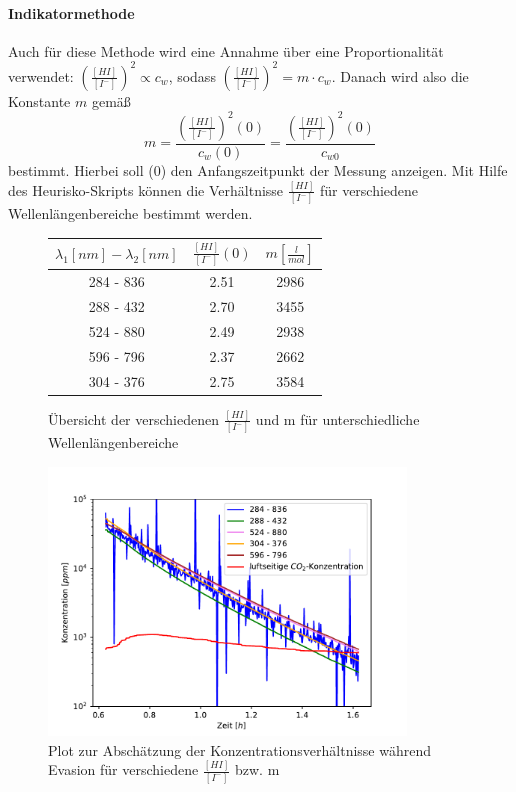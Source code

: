 \documentclass[12pt]{article}
\begin{document}
\paragraph{Indikatormethode\\}

Auch für diese Methode wird eine Annahme über eine Proportionalität verwendet: $(\frac{[HI]}{[I^-]})^2 \propto c_w $, sodass $(\frac{[HI]}{[I^-]})^2 = m \cdot c_w $. Danach wird also die Konstante $m$ gemäß
\begin{equation}
m = \frac{(\frac{[HI]}{[I^-]})^2(0)}{c_w(0)} = \frac{(\frac{[HI]}{[I^-]})^2(0)}{c_{w0}}
\end{equation}
bestimmt. Hierbei soll (0) den Anfangszeitpunkt der Messung anzeigen. Mit Hilfe des Heurisko-Skripts können die Verhältnisse $\frac{[HI]}{[I^-]}$ für verschiedene Wellenlängenbereiche bestimmt werden.

\begin{figure}[H]
	\centering
	\parbox{57.5mm}{
		\centering
		\begin{tabular}{c|c|c}
			$\lambda_1 [nm] - \lambda_2 [nm]$ & $\frac{[HI]}{[I^-]}(0)$ & $m [\frac{l}{mol}]$ \\ \hline
			284 - 836 & 2.51 & 2986 \\
			288 - 432 & 2.70 & 3455 \\
			524 - 880 & 2.49 & 2938 \\
			596 - 796 & 2.37 & 2662 \\
			304 - 376 & 2.75 & 3584
		\end{tabular}
		\caption{Übersicht der verschiedenen $\frac{[HI]}{[I^-]}$ und m für unterschiedliche Wellenlängenbereiche}
	}
	\hfill%
	\parbox{95mm}{
		\centering
		\includegraphics[width=95mm]{VE-Wasser/Indikator.pdf}
		\caption{Plot zur Abschätzung der Konzentrationsverhältnisse während Evasion für verschiedene $\frac{[HI]}{[I^-]}$ bzw. m}
	}
\end{figure}
\end{document}
